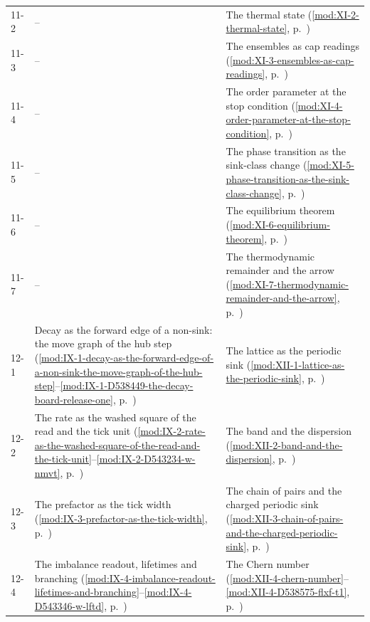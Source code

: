 {\begin{longtable}{p{11mm}p{70mm}p{60mm}}
11-2 & -- & The thermal state (\ref{mod:XI-2-thermal-state}, p.~\pageref{mod:XI-2-thermal-state}) \\
11-3 & -- & The ensembles as cap readings (\ref{mod:XI-3-ensembles-as-cap-readings}, p.~\pageref{mod:XI-3-ensembles-as-cap-readings}) \\
11-4 & -- & The order parameter at the stop condition (\ref{mod:XI-4-order-parameter-at-the-stop-condition}, p.~\pageref{mod:XI-4-order-parameter-at-the-stop-condition}) \\
11-5 & -- & The phase transition as the sink-class change (\ref{mod:XI-5-phase-transition-as-the-sink-class-change}, p.~\pageref{mod:XI-5-phase-transition-as-the-sink-class-change}) \\
11-6 & -- & The equilibrium theorem (\ref{mod:XI-6-equilibrium-theorem}, p.~\pageref{mod:XI-6-equilibrium-theorem}) \\
11-7 & -- & The thermodynamic remainder and the arrow (\ref{mod:XI-7-thermodynamic-remainder-and-the-arrow}, p.~\pageref{mod:XI-7-thermodynamic-remainder-and-the-arrow}) \\
12-1 & Decay as the forward edge of a non-sink: the move graph of the hub step (\ref{mod:IX-1-decay-as-the-forward-edge-of-a-non-sink-the-move-graph-of-the-hub-step}--\ref{mod:IX-1-D538449-the-decay-board-release-one}, p.~\pageref{mod:IX-1-decay-as-the-forward-edge-of-a-non-sink-the-move-graph-of-the-hub-step}) & The lattice as the periodic sink (\ref{mod:XII-1-lattice-as-the-periodic-sink}, p.~\pageref{mod:XII-1-lattice-as-the-periodic-sink}) \\
12-2 & The rate as the washed square of the read and the tick unit (\ref{mod:IX-2-rate-as-the-washed-square-of-the-read-and-the-tick-unit}--\ref{mod:IX-2-D543234-w-nmvt}, p.~\pageref{mod:IX-2-rate-as-the-washed-square-of-the-read-and-the-tick-unit}) & The band and the dispersion (\ref{mod:XII-2-band-and-the-dispersion}, p.~\pageref{mod:XII-2-band-and-the-dispersion}) \\
12-3 & The prefactor as the tick width (\ref{mod:IX-3-prefactor-as-the-tick-width}, p.~\pageref{mod:IX-3-prefactor-as-the-tick-width}) & The chain of pairs and the charged periodic sink (\ref{mod:XII-3-chain-of-pairs-and-the-charged-periodic-sink}, p.~\pageref{mod:XII-3-chain-of-pairs-and-the-charged-periodic-sink}) \\
12-4 & The imbalance readout, lifetimes and branching (\ref{mod:IX-4-imbalance-readout-lifetimes-and-branching}--\ref{mod:IX-4-D543346-w-lftd}, p.~\pageref{mod:IX-4-imbalance-readout-lifetimes-and-branching}) & The Chern number (\ref{mod:XII-4-chern-number}--\ref{mod:XII-4-D538575-flxf-t1}, p.~\pageref{mod:XII-4-chern-number}) \\

\end{longtable}}
